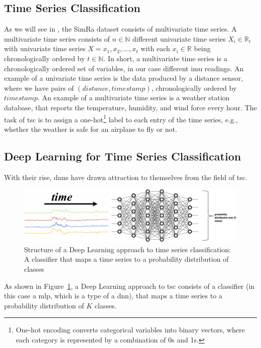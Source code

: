 \subsection{Time Series Classification}
As we will see in , the SimRa dataset consists of multivariate time series.
A multivariate time series consists of $n \in \mathbb{N}$ different univariate time series $X_{i} \in \mathbb{R}_{t}$ with univariate time series $X = x_{1}, x_{2},...,x_{t}$ with each $x_{i} \in \mathbb{R}$ being chronologically ordered by $t \in \mathbb{N}$.
In short, a multivariate time series is a chronologically ordered set of variables, in our case different \ac{imu} readings.
An example of a univariate time series is the data produced by a distance sensor, where we have pairs of $(distance,timestamp)$, chronologically ordered by $timestamp$.
An example of a multivariate time series is a weather station database, that reports the temperature, humidity, and wind force every hour.
The task of \ac{tsc} is to assign a one-hot\footnote{One-hot encoding converts categorical variables into binary vectors, where each category is represented by a combination of 0s and 1s.} label to each entry of the time series, e.g., whether the weather is safe for an airplane to fly or not.

\subsection{Deep Learning for Time Series Classification}
With their rise, \acp{dnn} have drawn attraction to themselves from the field of \ac{tsc}.

\begin{figure}
    \center
    \includegraphics[width=\columnwidth]{fig/deep_learning_structure.pdf}
    \caption{Structure of a Deep Learning approach to time series classification: A classifier that maps a time series to a probability distribution of classes~\cite{chen2021deep}}
    \label{fig:deep_learning_structure}
\end{figure}

As shown in Figure~\ref{fig:deep_learning_structure}, a Deep Learning approach to \ac{tsc} consists of a classifier (in this case a \ac{mlp}, which is a type of a \ac{dnn}), that maps a time series to a probability distribution of $K$ classes.

